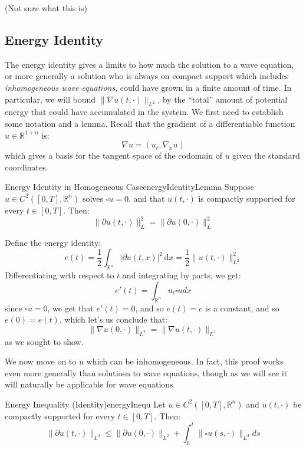 \documentclass{book}
\newenvironment{Proof}[1][]
  {\begin{ProofTcb}[#1]}
  {\end{ProofTcb}}
\newcommand{\R}{{\mathbb{R}}}
\begin{document}
(Not sure what this is)


\subsection{Energy Identity}\label{sec:energyIdentity}

The energy identity gives a limits to how much the solution to a wave equation, or more generally a solution who is
always on compact support which includes \emph{inhomogeneous wave equations}, could have grown in a finite amount of
time. In particular, we will bound $\|  \nabla u(t,
\cdot)\|_{L^2}$, by the ``total'' amount of potential energy that could have accumulated in the system. We first need to establish
some notation and a lemma. Recall that the gradient of a differentiable function $u \in \R^{1+n}$ is:
\[
	\nabla u = (u_t, \nabla_x u)
\]
which gives a basis for the tangent space of the codomain of $u$ given the standard coordinates.

\begin{lem}{Energy Identity in Homogeneous Case}{energyIdentityLemma}
	Suppose $u \in C^2([0, T], \R^n)$ solves $\square u = 0$. and that $u(t, \cdot)$ is compactly supported for every $t
	\in [0, T]$. Then:
	\[
		\|  \partial u(t, \cdot)\|_L^2 = \|  \partial u(0, \cdot)\|_L^2
	\]
\end{lem}

\begin{Proof}
	Define the energy identity:
	\[
		e(t) = \frac{1}{2}\int_{\R^n} |  \partial u(t,x)|^2\,\textrm{d}x = \frac{1}{2} \|u(t, \cdot)\|_{L^2}^2
	\]
	Differentiating with respect to $t$ and integrating by parts, we get:
	\[
		e'(t) =\int_{\R^n} u_t \square u dx
	\]
	since $\square u  = 0$, we get that $e'(t) = 0$, and so $e(t) = c$ is a constant, and so $e(0) = e(t)$, which let's
	us conclude that:
	\[
		\|\nabla u(0, \cdot)\|_{L^2} = \|\nabla u(t, \cdot)\|_{L^2}
	\]
	as we sought to show.
\end{Proof}

We now move on to $u$ which can be inhomogeneous. In fact, this proof works even more generally than solutiosn to wave
equations, though as we will see it will naturally be applicable for wave equations

\begin{thm}{Energy Inequality (Identity)}{energyInequ}
	Let $u \in C^2([0, T], \R^n)$ and $u(t, \cdot)$ be compactly supported for every $t \in [0,T]$. Then:
	\[
		\|  \partial u(t, \cdot) \|_{L^2} \le \|  \partial u(0, \cdot) \|_{L^2} + \int_{0}^t \|\square
		u(s,\cdot)\|_{L^2}ds
	\]
\end{thm}
\end{document}
